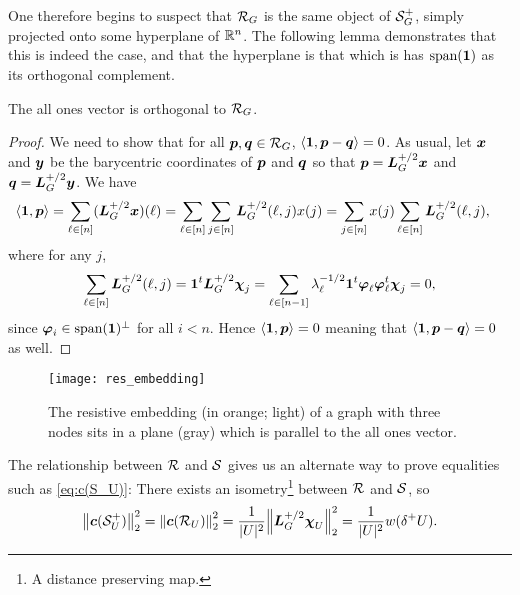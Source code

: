 One therefore begins to suspect that $\mathcal{R}_G$ is the same object of  $\mathcal{S}_G^+$, simply projected onto some hyperplane of $\mathbb{R}^n$. The following lemma  demonstrates that this is indeed the  case, and  that  the hyperplane  is that which is has $\textnormal{span}(\vb{1})$ as its orthogonal complement.  

\begin{lemma}
	The all ones vector is orthogonal to $\mathcal{R}_G$. 
\end{lemma}
\begin{proof}
	We need to show that for all $\vb*{p},\vb*{q}\in\mathcal{R}_G$, $\langle \vb{1},\vb*{p}-\vb*{q}\rangle=0$. As usual, let $\vb*{x}$ and $\vb*{y}$ be the barycentric coordinates of $\vb*{p}$ and $\vb*{q}$ so that $\vb*{p}=\vb*{L}_G^{+/2}\vb*{x}$ and $\vb*{q}=\vb*{L}_G^{+/2}\vb*{y}$. We have
	\begin{align*}
	\langle \vb{1},\vb*{p}\rangle &= \sum_{\ell\in[n]} (\vb*{L}_G^{+/2}\vb*{x})(\ell) = \sum_{\ell\in[n]} \sum_{j\in [n]}\vb*{L}_G^{+/2}(\ell,j)x(j) = \sum_{j\in[n]}x(j) \sum_{\ell\in[n]}\vb*{L}_G^{+/2}(\ell,j),
	\end{align*}
	where for any $j$, 
	\[\sum_{\ell\in[n]}\vb*{L}_G^{+/2}(\ell,j)= \vb{1}^t \vb*{L}_G^{+/2}\boldsymbol{\chi}_j=\sum_{\ell\in[n-1]} \lambda_\ell^{-1/2}\vb{1}^t \vb*{\varphi}_\ell\vb*{\varphi}_\ell^t\boldsymbol{\chi}_j=0,\]
	since $\vb*{\varphi}_i\in\textnormal{span}(\vb{1})^\perp$  for all $i<n$. Hence  $\langle \vb{1},\vb*{p}\rangle=0$ meaning that $\langle \vb{1},\vb*{p}-\vb*{q}\rangle=0$ as well. 
\end{proof}

\begin{figure}
	\centering
	\texttt{[image: res\_embedding]}
	\caption{The resistive embedding (in orange;  light) of a graph with three nodes sits in a plane (gray) which is parallel to the all ones vector. }
	\label{fig:res_embedding}
\end{figure}

The relationship between $\mathcal{R}$ and $\mathcal{S}$ gives us an alternate way to prove equalities such as \eqref{eq:c(S_U)}: There exists an isometry\footnote{A distance preserving map.} between $\mathcal{R}$ and $\mathcal{S}$, so 
\begin{equation*}
\norm{\vb*{c}(\mathcal{S}^+_U)}_2^2 = \norm{\vb*{c}(\mathcal{R}_U)}_2^2 = \frac{1}{|U|^2} \norm{\vb*{L}_G^{+/2}\boldsymbol{\chi}_U}_2^2 = \frac{1}{|U|^2}w(\delta^+ U).
\end{equation*}


